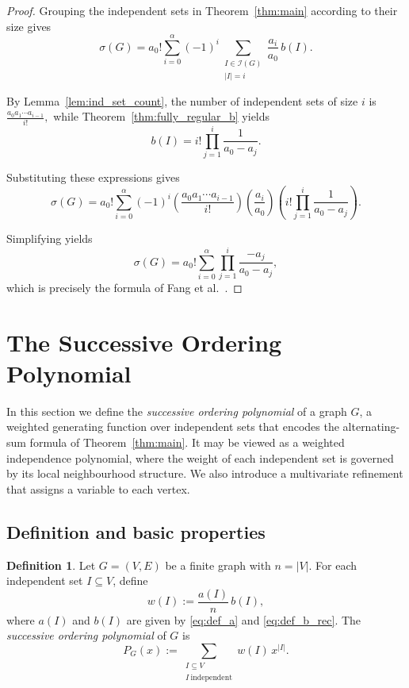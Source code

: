 \documentclass[11pt,a4paper]{article}
\numberwithin{equation}{section}
\theoremstyle{plain}
\theoremstyle{definition}
\newtheorem{definition}[theorem]{Definition}
\theoremstyle{remark}
\begin{document}
\begin{proof}
Grouping the independent sets in Theorem~\ref{thm:main} according to their size gives
\[
\sigma(G)
=
a_0!
\sum_{i=0}^{\alpha}
(-1)^i
\sum_{\substack{I\in\mathcal I(G)\\|I|=i}}
\frac{a_i}{a_0}\,b(I).
\]

By Lemma~\ref{lem:ind_set_count}, the number of independent sets of size \(i\) is
\(
\frac{a_0a_1\cdots a_{i-1}}{i!},
\)
while Theorem~\ref{thm:fully_regular_b} yields
\[
b(I)
=
i!
\prod_{j=1}^{i}
\frac1{a_0-a_j}.
\]

Substituting these expressions gives
\[
\sigma(G)
=
a_0!
\sum_{i=0}^{\alpha}
(-1)^i
\left(
\frac{a_0a_1\cdots a_{i-1}}{i!}
\right)
\left(
\frac{a_i}{a_0}
\right)
\left(
i!
\prod_{j=1}^{i}
\frac1{a_0-a_j}
\right).
\]

Simplifying yields
\[
\sigma(G)
=
a_0!
\sum_{i=0}^{\alpha}
\prod_{j=1}^{i}
\frac{-a_j}{a_0-a_j},
\]
which is precisely the formula of Fang et al.~\cite{fang2023}.
\end{proof}

\section{The Successive Ordering Polynomial}
\label{sec:polynomial}

In this section we define the \textit{successive ordering polynomial} of a graph \(G\), a weighted generating function over independent sets that encodes the alternating-sum formula of Theorem~\ref{thm:main}. It may be viewed as a weighted independence polynomial, where the weight of each independent set is governed by its local neighbourhood structure. We also introduce a multivariate refinement that assigns a variable to each vertex.

\subsection{Definition and basic properties} \label{subsec:polynomial}

\begin{definition}
\label{def:successive-poly}
Let \(G=(V,E)\) be a finite graph with \(n=|V|\). For each independent set \(I\subseteq V\), define
\[
w(I):=\frac{a(I)}{n}\,b(I),
\]
where \(a(I)\) and \(b(I)\) are given by \eqref{eq:def_a} and \eqref{eq:def_b_rec}. 
The \emph{successive ordering polynomial} of \(G\) is
\[
P_G(x):=\sum_{\substack{I\subseteq V\\ I\ \mathrm{independent}}} w(I)\,x^{|I|}.
\]
\end{definition}
\end{document}
